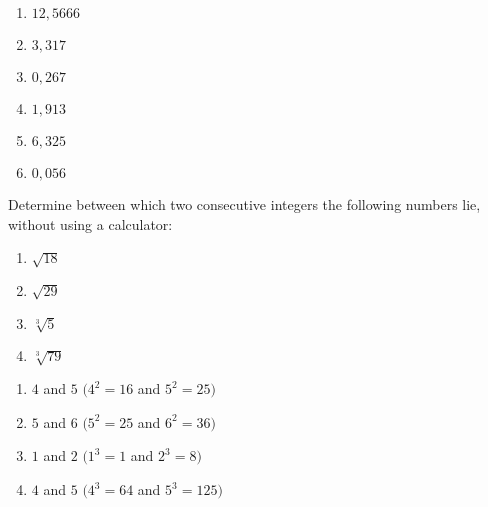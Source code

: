 
 \begin{solutions}{}{
\begin{multicols}{2}
\begin{enumerate}[itemsep=0pt, label=\textbf{\arabic*}. ] 
 \item $12,5666$%
\item $3,317$%
\item $0,267$%
\item $1,913$
\item $6,325$%
\item $0,056$%
\end{enumerate}
\end{multicols}}
\end{solutions}


\begin{exercises}{}
 {
Determine between which two consecutive integers the following numbers lie, without using a calculator:
\begin{multicols}{2}
\begin{enumerate}[noitemsep, label=\textbf{\arabic*}. ]
\item $\sqrt{18}$
\item $\sqrt{29}$
\item $\sqrt[3]{5}$
\item $\sqrt[3]{79}$

\end{enumerate}
\end{multicols}
}
\end{exercises}

 \begin{solutions}{}{
\begin{multicols}{2}
\begin{enumerate}[noitemsep, label=\textbf{\arabic*}. ]
\item $4$ and $5$ $(4^2 = 16$ and $5^2=25)$%
\item $5$ and $6$ $(5^2 = 25$ and $6^2=36)$%
\item $1$ and $2$ $(1^3 = 1$ and $2^3=8)$%
\item $4$ and $5$ $(4^3 = 64$ and $5^3=125)$%
\end{enumerate}
\end{multicols}
}
\end{solutions}


